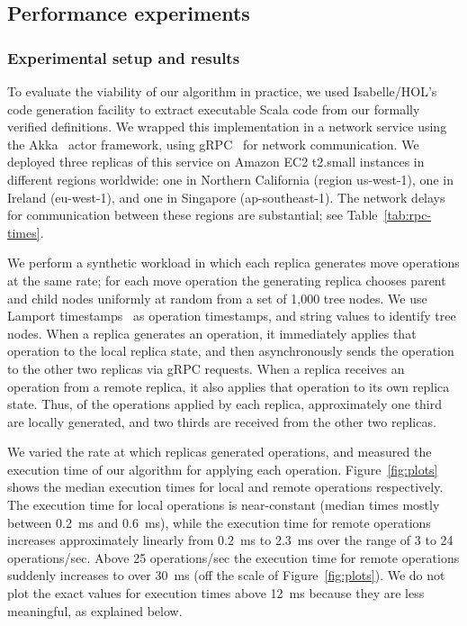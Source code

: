 \documentclass[sigconf]{acmart}
\begin{document}
\subsection{Performance experiments}

\subsubsection{Experimental setup and results}

To evaluate the viability of our algorithm in practice, we used Isabelle/HOL's code generation facility to extract executable Scala code from our formally verified definitions.
We wrapped this implementation in a network service using the Akka~\cite{Akka} actor framework, using gRPC~\cite{gRPC} for network communication.
We deployed three replicas of this service on Amazon EC2 t2.small instances in different regions worldwide: one in Northern California (region us-west-1), one in Ireland (eu-west-1), and one in Singapore (ap-southeast-1).
The network delays for communication between these regions are substantial; see Table~\ref{tab:rpc-times}.

We perform a synthetic workload in which each replica generates move operations at the same rate; for each move operation the generating replica chooses parent and child nodes uniformly at random from a set of 1,000 tree nodes.
We use Lamport timestamps~\cite{Lamport:1978jq} as operation timestamps, and string values to identify tree nodes.
When a replica generates an operation, it immediately applies that operation to the local replica state, and then asynchronously sends the operation to the other two replicas via gRPC requests.
When a replica receives an operation from a remote replica, it also applies that operation to its own replica state.
Thus, of the operations applied by each replica, approximately one third are locally generated, and two thirds are received from the other two replicas.

We varied the rate at which replicas generated operations, and measured the execution time of our algorithm for applying each operation.
Figure~\ref{fig:plots} shows the median execution times for local and remote operations respectively.
The execution time for local operations is near-constant (median times mostly between 0.2~ms and 0.6~ms), while the execution time for remote operations increases approximately linearly from 0.2~ms to 2.3~ms over the range of 3 to 24 operations/sec.
Above 25 operations/sec the execution time for remote operations suddenly increases to over 30~ms (off the scale of Figure~\ref{fig:plots}).
We do not plot the exact values for execution times above 12~ms because they are less meaningful, as explained below.
\end{document}
